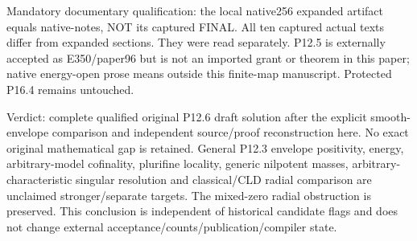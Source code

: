 \documentclass[11pt]{article}
\begin{document}
\begin{ReviewBody}
Mandatory documentary qualification: the local native256 expanded artifact equals native-notes, NOT its captured FINAL. All ten captured actual texts differ from expanded sections. They were read separately. P12.5 is externally accepted as E350/paper96 but is not an imported grant or theorem in this paper; native energy-open prose means outside this finite-map manuscript. Protected P16.4 remains untouched.

Verdict: complete qualified original P12.6 draft solution after the explicit smooth-envelope comparison and independent source/proof reconstruction here. No exact original mathematical gap is retained. General P12.3 envelope positivity, energy, arbitrary-model cofinality, plurifine locality, generic nilpotent masses, arbitrary-characteristic singular resolution and classical/CLD radial comparison are unclaimed stronger/separate targets. The mixed-zero radial obstruction is preserved. This conclusion is independent of historical candidate flags and does not change external acceptance/counts/publication/compiler state.
\end{ReviewBody}

\appendix
\end{document}
